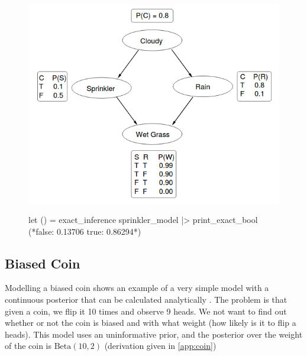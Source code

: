 \begin{figure}[!htb]
	\centering
	\begin{minipage}{0.47\linewidth}
		\label{lst:sprinkler}						
	\end{minipage}
	\begin{minipage}{0.47\linewidth}
		\includegraphics[width=\linewidth]{figs/sprinkler-network.png}
		\label{fig:sprinkler-network}
		\vspace{0.3cm}
		\begin{ocamlcode-in}
let () =
  exact_inference sprinkler_model
  |> print_exact_bool
(*false: 0.13706 true: 0.86294*)
		\end{ocamlcode-in}
		\label{lst:inf-output}
	\end{minipage}
\end{figure}

\subsection{Biased Coin} \label{sec:coin} 
Modelling a biased coin shows an example of a very simple model with a continuous posterior that can be calculated analytically \cite{datasci}. The problem is that given a coin, we flip it 10 times and observe 9 heads. We not want to find out whether or not the coin is biased and with what weight (how likely is it to flip a heads). This model uses an uninformative prior, and the posterior over the weight of the coin is $\text{Beta}(10,2)$ (derivation given in \ref{app:coin})

